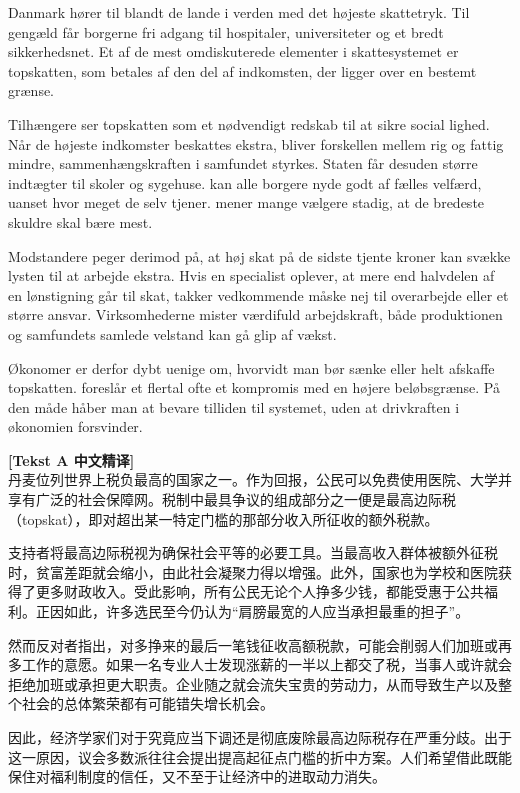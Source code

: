 Danmark hører til blandt de lande i verden med det højeste skattetryk. Til gengæld får borgerne fri adgang til hospitaler, universiteter og et bredt sikkerhedsnet. Et af de mest omdiskuterede elementer i skattesystemet er topskatten, som betales af den del af indkomsten, der ligger over en bestemt grænse.

Tilhængere ser topskatten som et nødvendigt redskab til at sikre social lighed. Når de højeste indkomster beskattes ekstra, bliver forskellen mellem rig og fattig mindre,  sammenhængskraften i samfundet styrkes. Staten får desuden større indtægter til skoler og sygehuse.  kan alle borgere nyde godt af fælles velfærd, uanset hvor meget de selv tjener.  mener mange vælgere stadig, at de bredeste skuldre skal bære mest.

Modstandere peger derimod på, at høj skat på de sidste tjente kroner kan svække lysten til at arbejde ekstra. Hvis en specialist oplever, at mere end halvdelen af en lønstigning går til skat, takker vedkommende måske nej til overarbejde eller et større ansvar. Virksomhederne mister  værdifuld arbejdskraft,  både produktionen og samfundets samlede velstand kan gå glip af vækst.

Økonomer er derfor dybt uenige om, hvorvidt man bør sænke eller helt afskaffe topskatten.  foreslår et flertal ofte et kompromis med en højere beløbsgrænse. På den måde håber man at bevare tilliden til systemet, uden at drivkraften i økonomien forsvinder.

\begin{transbox}
\small
\textbf{\color{NCDTeal}[Tekst A 中文精译]}\\
丹麦位列世界上税负最高的国家之一。作为回报，公民可以免费使用医院、大学并享有广泛的社会保障网。税制中最具争议的组成部分之一便是最高边际税（topskat），即对超出某一特定门槛的那部分收入所征收的额外税款。

支持者将最高边际税视为确保社会平等的必要工具。当最高收入群体被额外征税时，贫富差距就会缩小，由此社会凝聚力得以增强。此外，国家也为学校和医院获得了更多财政收入。受此影响，所有公民无论个人挣多少钱，都能受惠于公共福利。正因如此，许多选民至今仍认为“肩膀最宽的人应当承担最重的担子”。

然而反对者指出，对多挣来的最后一笔钱征收高额税款，可能会削弱人们加班或再多工作的意愿。如果一名专业人士发现涨薪的一半以上都交了税，当事人或许就会拒绝加班或承担更大职责。企业随之就会流失宝贵的劳动力，从而导致生产以及整个社会的总体繁荣都有可能错失增长机会。

因此，经济学家们对于究竟应当下调还是彻底废除最高边际税存在严重分歧。出于这一原因，议会多数派往往会提出提高起征点门槛的折中方案。人们希望借此既能保住对福利制度的信任，又不至于让经济中的进取动力消失。
\end{transbox}

